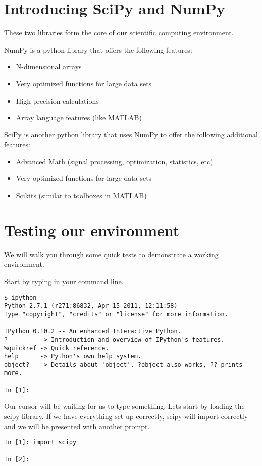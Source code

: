 \section*{Introducing SciPy and NumPy}
These two libraries form the core of our scientific computing environment.

NumPy is a python library that offers the following features:
\begin{itemize}
\item N-dimensional arrays
\item Very optimized functions for large data sets
\item High precision calculations
\item Array language features (like MATLAB)
\end{itemize}

SciPy is another python library that uses NumPy to offer the following additional features:
\begin{itemize}
\item Advanced Math (signal processing, optimization, statistics, etc)
\item Very optimized functions for large data sets
\item Scikits (similar to toolboxes in MATLAB)
\end{itemize}

\section*{Testing our environment}
We will walk you through some quick tests to demonstrate a working environment.

Start by typing  in your command line.
\begin{lstlisting}
$ ipython
Python 2.7.1 (r271:86832, Apr 15 2011, 12:11:58)
Type "copyright", "credits" or "license" for more information.

IPython 0.10.2 -- An enhanced Interactive Python.
?         -> Introduction and overview of IPython's features.
%quickref -> Quick reference.
help      -> Python's own help system.
object?   -> Details about 'object'. ?object also works, ?? prints more.

In [1]:
\end{lstlisting}

Our cursor will be waiting for us to type something.  Lets start by loading the scipy library.  If we have everything set up correctly, scipy will import correctly and we will be presented with another prompt.
\begin{lstlisting}
In [1]: import scipy

In [2]:
\end{lstlisting}


